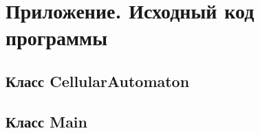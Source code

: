 \documentclass[a4paper,14pt]{extarticle}
\begin{document}
\newpage
\section*{Приложение. Исходный код программы}
\label{app:code}

\subsection*{Класс CellularAutomaton}


\subsection*{Класс Main}

\end{document}
